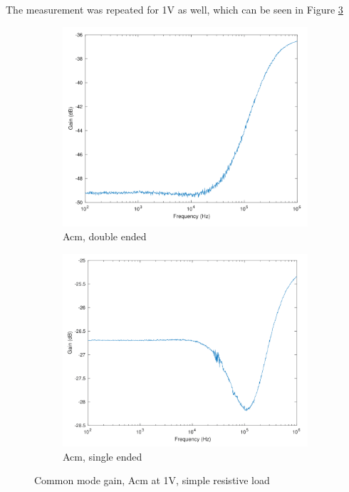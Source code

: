 The measurement was repeated for 1V as well, which can be seen in Figure \ref{fig:resloadAcm1Vsimple} 

\begin{figure}[H]
    \centering
    \begin{subfigure}[b]{0.45\textwidth}
        \centering
        \includegraphics[width=\textwidth]{ExperimentalImplementation/Acm_double_ended_resist_simple_1v.png}
        \caption{Acm, double ended}
        \label{fig:blue_led}
    \end{subfigure}
    \hfill
    \begin{subfigure}[b]{0.45\textwidth}
        \centering
        \includegraphics[width=\textwidth]{ExperimentalImplementation/Acm_resist_single_1v_simple.png}
        \caption{Acm, single ended}
        \label{fig:blue_led}
    \end{subfigure}
    \caption{Common mode gain, Acm at 1V, simple resistive load}
    \label{fig:resloadAcm1Vsimple}
\end{figure} 

